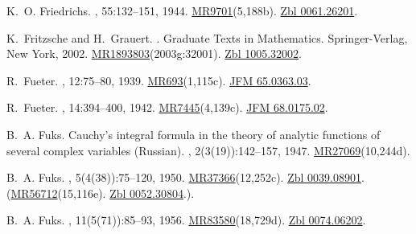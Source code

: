 \documentclass[11pt,a4paper, final, twoside]{article}
\numberwithin{equation}{section}
\begin{document}
\begin{appendices}
\begin{thebibliography}{100}
K.~O. Friedrichs.
,
  55:132--151, 1944.
\newblock \href{http://www.ams.org/mathscinet-getitem?mr=9701}{MR9701}(5,188b).
  \href{http://zbmath.org/?q=an:0061.26201}{Zbl 0061.26201}.

K.~Fritzsche and H.~Grauert.
.
\newblock Graduate Texts in Mathematics. Springer-Verlag, New York, 2002.
\newblock
  \href{http://www.ams.org/mathscinet-getitem?mr=1893803}{MR1893803}(2003g:32001).
  \href{http://zbmath.org/?q=an:1005.32002}{Zbl 1005.32002}.

R.~Fueter.
, 12:75--80, 1939.
\newblock \href{http://www.ams.org/mathscinet-getitem?mr=693}{MR693}(1,115c).
  \href{http://zbmath.org/?q=an:65.0363.03}{JFM 65.0363.03}.

R.~Fueter.
, 14:394--400, 1942.
\newblock \href{http://www.ams.org/mathscinet-getitem?mr=7445}{MR7445}(4,139c).
  \href{http://zbmath.org/?q=an:68.0175.02}{JFM 68.0175.02}.

B.~A. Fuks.
\newblock Cauchy's integral formula in the theory of analytic functions of
  several complex variables ({R}ussian).
, 2(3(19)):142--157, 1947.
\newblock
  \href{http://www.ams.org/mathscinet-getitem?mr=27069}{MR27069}(10,244d).

B.~A. Fuks.
, 5(4(38)):75--120, 1950.
\newblock
  \href{http://www.ams.org/mathscinet-getitem?mr=37366}{MR37366}(12,252c).
  \href{http://zbmath.org/?q=an:0039.08901}{Zbl 0039.08901}.
  (\href{http://www.ams.org/mathscinet-getitem?mr=56712}{MR56712}(15,116e).
  \href{http://zbmath.org/?q=an:0052.30804}{Zbl 0052.30804}.).

B.~A. Fuks.
, 11(5(71)):85--93, 1956.
\newblock
  \href{http://www.ams.org/mathscinet-getitem?mr=83580}{MR83580}(18,729d).
  \href{http://zbmath.org/?q=an:0074.06202}{Zbl 0074.06202}.


\end{thebibliography}
\end{appendices}
\end{document}
